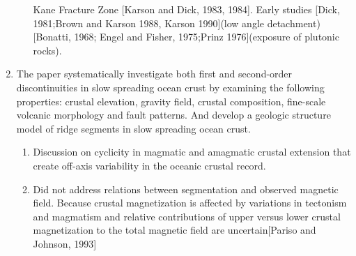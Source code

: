 \documentclass[11pt]{article}
\begin{document}
\begin{enumerate}
\begin{enumerate}
\label{sec-1-1-1-7-2}
Kane Fracture Zone [Karson and Dick, 1983, 1984].   Early studies [Dick, 1981;Brown and Karson 1988, Karson 1990](low angle detachment) [Bonatti, 1968; Engel and Fisher, 1975;Prinz 1976](exposure of plutonic rocks).
\end{enumerate}
\item The paper systematically investigate both first and second-order discontinuities in slow spreading ocean crust by examining the following properties: crustal elevation, gravity field, crustal composition, fine-scale volcanic morphology and fault patterns. And develop a geologic structure model of ridge segments in slow spreading ocean crust.
\label{sec-1-1-1-8}
\begin{enumerate}
\item Discussion on cyclicity in magmatic and amagmatic crustal extension that create off-axis variability in the oceanic crustal record.
\label{sec-1-1-1-8-1}
\item Did not address relations between segmentation and observed magnetic field. Because crustal magnetization is affected by variations in tectonism and magmatism and relative contributions of upper versus lower crustal magnetization to the total magnetic field are uncertain[Pariso and Johnson, 1993]
\label{sec-1-1-1-8-2}
\end{enumerate}
\end{enumerate}
\end{document}
